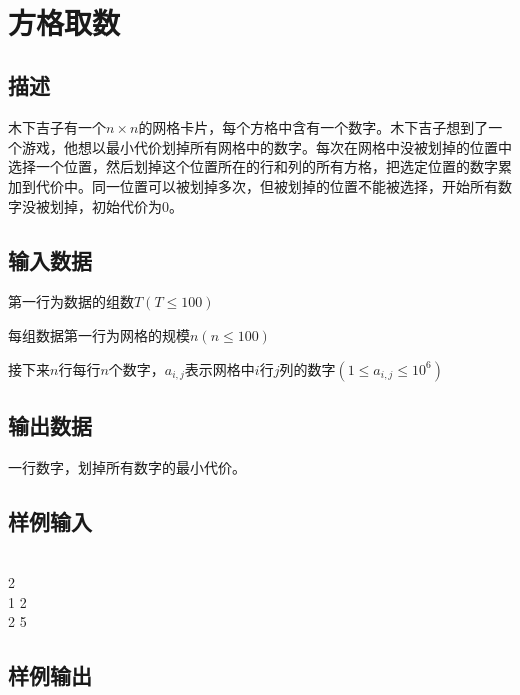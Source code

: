 \documentclass[UTF8]{ctexrep}
\begin{document}
\tt
{}
\fi


\section{方格取数}
\subsection*{描述}
木下吉子有一个$n\times n$的网格卡片，每个方格中含有一个数字。木下吉子想到了一个游戏，他想以最小代价划掉所有网格中的数字。每次在网格中没被划掉的位置中选择一个位置，然后划掉这个位置所在的行和列的所有方格，把选定位置的数字累加到代价中。同一位置可以被划掉多次，但被划掉的位置不能被选择，开始所有数字没被划掉，初始代价为0。

\subsection*{输入数据}
第一行为数据的组数$T(T\leqslant 100)$

每组数据第一行为网格的规模$n(n\leqslant 100)$

接下来$n$行每行$n$个数字，$a_{i,j}$表示网格中$i$行$j$列的数字$(1\leqslant a_{i,j}\leqslant 10^6)$

\subsection*{输出数据}
一行数字，划掉所有数字的最小代价。

\subsection*{样例输入}
\\
2\\
1 2\\
2 5

\subsection*{样例输出}


\ifx\allfiles\undefined
\end{document}
